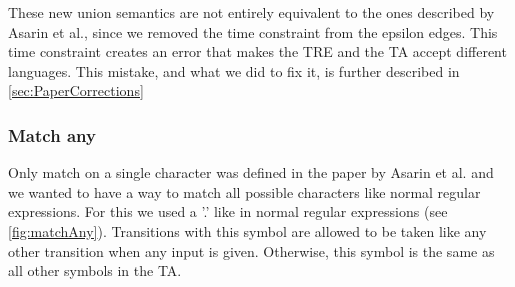 
\label{fig:union}
\vspace{0.75em}

These new union semantics are not entirely equivalent to the ones described by Asarin et al., since we removed the time constraint from the epsilon edges.
This time constraint creates an error that makes the TRE and the TA accept different languages.
This mistake, and what we did to fix it, is further described in \cref{sec:PaperCorrections}

\subsubsection{Match any}
Only match on a single character was defined in the paper by Asarin et al. and we wanted to have a way to match all possible characters like normal regular expressions. For this we used a '.' like in normal regular expressions (see \cref{fig:matchAny}). Transitions with this symbol are allowed to be taken like any other transition when any input is given. Otherwise, this symbol is the same as all other symbols in the TA.


\label{fig:matchAny}